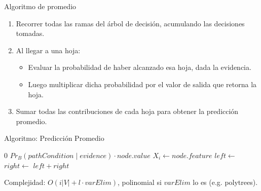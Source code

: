 





\begin{frame}[noframenumbering]{Algoritmo de promedio}
	\begin{enumerate}[<+- | alert@+>]
		\item Recorrer todas las ramas del árbol de decisión, acumulando las decisiones tomadas.
		\item Al llegar a una hoja:
		\begin{itemize}
			\item Evaluar la probabilidad de haber alcanzado esa hoja, dada la evidencia. 
			\item Luego multiplicar dicha probabilidad por el valor de salida que retorna la hoja.
		\end{itemize}
		\item Sumar todas las contribuciones de cada hoja para obtener la predicción promedio. 
	\end{enumerate}
\end{frame}


\begin{frame}{Algoritmo: Predicción Promedio}
	\begin{algorithm}[H] %
		\caption{Predicción promedio para árbol de decisión binario}
		\footnotesize            %
		\begin{algorithmic}[1]
			\State \Return $0$
			\EndIf
			\State \Return $Pr_B(pathCondition \mid evidence)\cdot node.value$
			\EndIf
			\State $X_i \gets node.feature$
			\State $left \gets$  
			\State $right\gets$  
			\State \Return $left + right$
			\EndFunction
		\end{algorithmic}
	\end{algorithm}
	\vspace{0.3cm}
	Complejidad: $O(i|V| + l \cdot varElim)$, polinomial si $varElim$ lo es (e.g. polytrees).
\end{frame}


